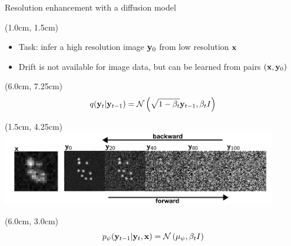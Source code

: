 \documentclass{beamer}					%
\begin{document}
\begin{frame}{Resolution enhancement with a diffusion model}

\begin{textblock*}{13cm}(1.0cm, 1.5cm)

\begin{itemize}
\item Task: infer a high resolution image $\bold{y}_0$ from low resolution $\bold{x}$
\item Drift is not available for image data, but can be learned from pairs $(\bold{x},\bold{y}_{0})$
\end{itemize}
\end{textblock*}

\begin{textblock*}{2cm}(6.0cm, 7.25cm)
\begin{equation*}
q(\bold{y}_{t}|\bold{y}_{t-1}) = \mathcal{N}\left(\sqrt{1-\beta_{t}}\bold{y}_{t-1},\beta_t I\right)
\end{equation*}
\end{textblock*}

\begin{textblock*}{12cm}(1.5cm, 4.25cm)
\includegraphics[width=12cm]{../../phd/ddpm/ddpm/media/ForwardBackward.png}
\end{textblock*}

\begin{textblock*}{2cm}(6.0cm, 3.0cm)
\begin{equation*}
p_{\psi}(\bold{y}_{t-1}|\bold{y}_{t},\bold{x}) = \mathcal{N}\left(\mu_{\psi},\beta_{t}I\right)
\end{equation*}

\end{textblock*}

\end{frame}
\end{document}
